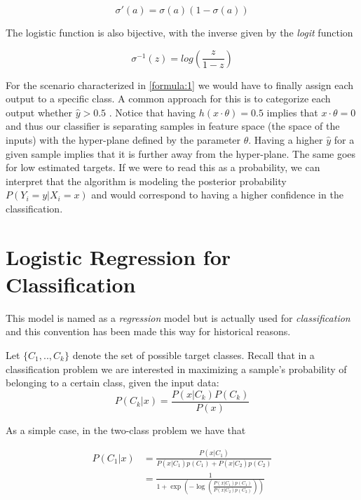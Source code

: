 \begin{equation} \label{eq:derivativeLogisticFunction}
\sigma '(a) = \sigma(a)( 1 - \sigma(a) )
\end{equation}

The logistic function is also bijective, with the inverse given by the \textit{logit} function

\begin{equation} \label{eq:logitFunction}
\sigma^{-1}(z)  = log( \frac{z}{1 - z})
\end{equation}

For the scenario characterized in \ref{formula:1} we would have to finally assign each output to a specific class. A common approach for this is to categorize each output whether $\hat{y} > 0.5$ \label{formula:logitThreshold}. Notice that having $h(x \cdot \theta) = 0.5$ implies that $x \cdot  \theta = 0$ and thus our classifier is separating samples in feature space (the space of the inputs) with the hyper-plane defined by the parameter $\theta$. Having a higher $\hat{y}$ for a given sample implies that it is further away from the hyper-plane. The same goes for low estimated targets. If we were to read this as a probability, we can interpret that the algorithm is modeling the posterior probability $P(Y_i = y | X_i = x)$ and would correspond to having a higher confidence in the classification.




\section{Logistic Regression for Classification}\label{section-logisticRegression}

This model is named as a \textit{regression} model but is actually used for \textit{classification} and this convention has been made this way for historical reasons.


Let $\{C_1,..,C_k\}$ denote the set of possible target classes. Recall that in a classification problem we are  interested in maximizing a sample's probability of belonging to a certain class, given the input data:
$$P(C_k| x) = \frac{P(x|C_k)P(C_k)}{P(x)} $$

As a simple case, in the two-class problem we have that


\begin{equation}
\begin{split}
P(C_1| x) & = \frac{P(x|C_1) }{P(x|C_1)p(C_1) + P(x|C_2)p(C_2)} \\
& = \frac{1 }
{1 + \exp(- \log( \frac{ P(x|C_1)p(C_1)}
{P(x|C_2)p(C_2)
}))
}
\end{split}
\end{equation}

